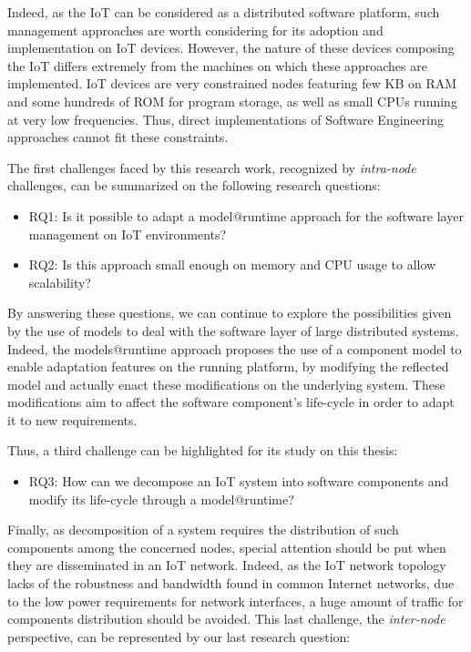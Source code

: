 Indeed, as the IoT can be considered as a distributed software platform, such management approaches are worth considering for its adoption and implementation on IoT devices.
However, the nature of these devices composing the IoT differs extremely from the machines on which these approaches are implemented.
IoT devices are very constrained nodes featuring few KB on RAM and some hundreds of ROM for program storage, as well as small CPUs running at very low frequencies.
Thus, direct implementations of Software Engineering approaches cannot fit these constraints.

The first challenges faced by this research work, recognized by \textit{intra-node} challenges, can be summarized on the following research questions:

\begin{itemize}
	\item RQ1: Is it possible to adapt a model@runtime approach for the software layer management on IoT environments?
	\item RQ2: Is this approach small enough on memory and CPU usage to allow scalability?
\end{itemize}

By answering these questions, we can continue to explore the possibilities given by the use of models to deal with the software layer of large distributed systems.
Indeed, the models@runtime approach proposes the use of a component model to enable adaptation features on the running platform, by modifying the reflected model and actually enact these modifications on the underlying system.
These modifications aim to affect the software component's life-cycle in order to adapt it to new requirements.

Thus, a third challenge can be highlighted for its study on this thesis:

\begin{itemize}
	\item RQ3: How can we decompose an IoT system into software components and modify its life-cycle through a model@runtime?
\end{itemize}

Finally, as decomposition of a system requires the distribution of such components among the concerned nodes, special attention should be put when they are disseminated in an IoT network.
Indeed, as the IoT network topology lacks of the robustness and bandwidth found in common Internet networks, due to the low power requirements for network interfaces, a huge amount of traffic for components distribution should be avoided.
This last challenge, the \textit{inter-node} perspective, can be represented by our last research question:

